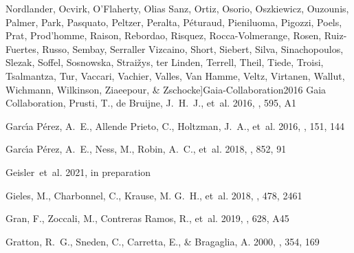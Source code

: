 \documentclass[onecolumn]{aa}
\begin{document}
\begin{thebibliography}{149}
{		{Nordlander}, {Ocvirk}, {O'Flaherty}, {Olias Sanz}, {Ortiz}, {Osorio},
		{Oszkiewicz}, {Ouzounis}, {Palmer}, {Park}, {Pasquato}, {Peltzer}, {Peralta},
		{P{\'e}turaud}, {Pieniluoma}, {Pigozzi}, {Poels}, {Prat}, {Prod'homme},
		{Raison}, {Rebordao}, {Risquez}, {Rocca-Volmerange}, {Rosen}, {Ruiz-Fuertes},
		{Russo}, {Sembay}, {Serraller Vizcaino}, {Short}, {Siebert}, {Silva},
		{Sinachopoulos}, {Slezak}, {Soffel}, {Sosnowska}, {Strai{\v{z}}ys}, {ter
			Linden}, {Terrell}, {Theil}, {Tiede}, {Troisi}, {Tsalmantza}, {Tur},
		{Vaccari}, {Vachier}, {Valles}, {Van Hamme}, {Veltz}, {Virtanen}, {Wallut},
		{Wichmann}, {Wilkinson}, {Ziaeepour}, \& {Zschocke}}]{Gaia-Collaboration2016}
	{Gaia Collaboration}, {Prusti}, T., {de Bruijne}, J.~H.~J., {et~al.} 2016,
	\aap, 595, A1
	
	{Garc{\'\i}a P{\'e}rez}, A.~E., {Allende Prieto}, C., {Holtzman}, J.~A.,
	{et~al.} 2016, \aj, 151, 144
	
	{Garc{\'\i}a P{\'e}rez}, A.~E., {Ness}, M., {Robin}, A.~C., {et~al.} 2018,
	\apj, 852, 91
	
	{Geisler~et~al.} 2021, in preparation
	
	{Gieles}, M., {Charbonnel}, C., {Krause}, M. G.~H., {et~al.} 2018, \mnras, 478,
	2461
	
	{Gran}, F., {Zoccali}, M., {Contreras Ramos}, R., {et~al.} 2019, \aap, 628, A45
	
	{Gratton}, R.~G., {Sneden}, C., {Carretta}, E., \& {Bragaglia}, A. 2000, \aap,
	354, 169
	

\end{thebibliography}
\end{document}
